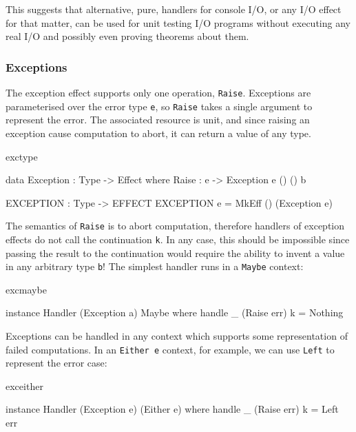 \noindent
This suggests that alternative, pure, handlers for console I/O,
or any I/O effect for that matter, can be used for unit testing I/O programs
without executing any real I/O and possibly even proving theorems about them.

\subsubsection{Exceptions}

The exception effect supports only one operation, \texttt{Raise}.
Exceptions are parameterised over the error type \texttt{e}, so \texttt{Raise}
takes a single argument to represent the error. The associated resource is
unit, and since raising an exception cause computation to abort, it can return
a value of any type.

\begin{SaveVerbatim}{exctype}

data Exception : Type -> Effect where
     Raise : e -> Exception e () () b 

EXCEPTION : Type -> EFFECT
EXCEPTION e = MkEff () (Exception e) 

\end{SaveVerbatim}

\noindent
The semantics of \texttt{Raise} is to abort computation, therefore handlers
of exception effects do not call the continuation \texttt{k}. In any case, 
this should be impossible since passing the result to the continuation would
require the ability to invent a value in any arbitrary type \texttt{b}!
The simplest handler runs in a \texttt{Maybe} context:

\begin{SaveVerbatim}{excmaybe}

instance Handler (Exception a) Maybe where
     handle _ (Raise err) k = Nothing

\end{SaveVerbatim}

\noindent
Exceptions can be handled in any context which supports some representation of
failed computations. In an \texttt{Either e} context, for example, we can
use \texttt{Left} to represent the error case:

\begin{SaveVerbatim}{exceither}

instance Handler (Exception e) (Either e) where
     handle _ (Raise err) k = Left err

\end{SaveVerbatim}

